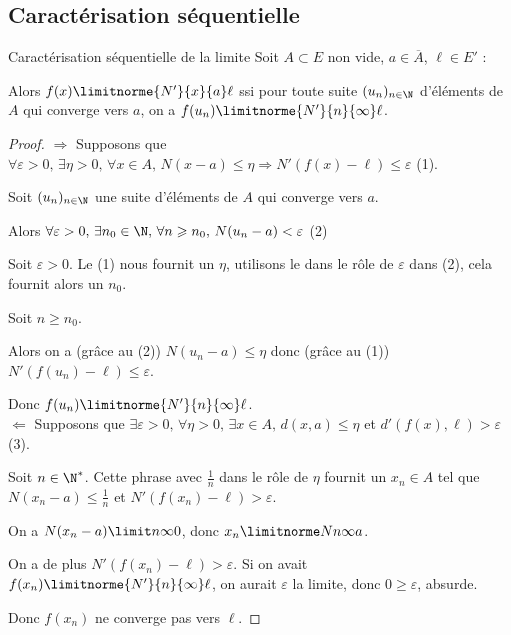 \subsection{Caractérisation séquentielle}

\begin{theorement}{Caractérisation séquentielle de la limite}{}
    Soit $A \subset E$ non vide, $a \in \overline A$, $\ell \in E'$ :

    Alors $f(x) \limitnorme{N'}{x}{a} \ell$ ssi pour toute suite $(u_n)_{n \in \N}$ 
    d'éléments de $A$ qui converge vers $a$, on a $f(u_n) \limitnorme{N'}{n}{\infty} \ell$.
\end{theorement}


\begin{proof}
    $\Rightarrow$ Supposons que $\forall \varepsilon > 0, \, \exists \eta > 0, \, \forall x \in A, \, N(x - a) \leqslant \eta \Rightarrow N'(f(x) - \ell) \leqslant \varepsilon$ (1).

    Soit $(u_n)_{n \in \N}$ une suite d'éléments de $A$ qui converge vers $a$.

    Alors $\forall \varepsilon > 0, \, \exists n_0 \in \N, \, \forall n \geqslant n_0, \, N(u_n - a) < \varepsilon$ (2)

    Soit $\varepsilon > 0$. Le (1) nous fournit un $\eta$, utilisons le dans le rôle de $\varepsilon$ dans (2),
    cela fournit alors un $n_0$.

    Soit $n \geqslant n_0$. 

    Alors on a (grâce au (2)) $N(u_n - a) \leqslant \eta$ donc (grâce au (1)) $N'(f(u_n) - \ell) \leqslant \varepsilon$.

    Donc $f(u_n) \limitnorme{N'}{n}{\infty} \ell$. \\

    $\Leftarrow$ Supposons que $\exists \varepsilon > 0, \, \forall \eta > 0, \, \exists x \in A, \, d(x, a) \leqslant \eta $ et $d'(f(x), \ell) > \varepsilon$ (3).

    Soit $n \in \N^*$. Cette phrase avec $\frac 1 n$ dans le rôle de $\eta$ fournit
    un $x_n \in A$ tel que $N(x_n - a) \leqslant \frac 1 n$ et $N'(f(x_n) - \ell) > \varepsilon$.

    On a $N(x_n - a) \limit n \infty 0$, donc $x_n \limitnorme N n \infty a$.

    On a de plus $N'(f(x_n) - \ell) > \varepsilon$. Si on avait $f(x_n) \limitnorme{N'}{n}{\infty} \ell$, 
    on aurait $\varepsilon$ la limite, donc $0 \geqslant \varepsilon$, absurde.

    Donc $f(x_n)$ ne converge pas vers $\ell$.
\end{proof}



